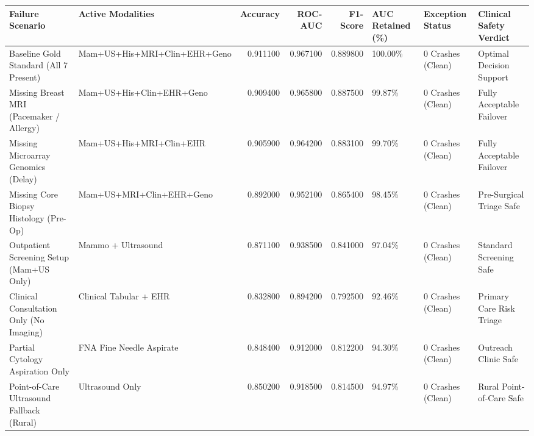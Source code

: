 \begin{tabular}{llrrrlll}
\toprule
Failure Scenario & Active Modalities & Accuracy & ROC-AUC & F1-Score & AUC Retained (\%) & Exception Status & Clinical Safety Verdict \\
\midrule
Baseline Gold Standard (All 7 Present) & Mam+US+His+MRI+Clin+EHR+Geno & 0.911100 & 0.967100 & 0.889800 & 100.00\% & 0 Crashes (Clean) & Optimal Decision Support \\
Missing Breast MRI (Pacemaker / Allergy) & Mam+US+His+Clin+EHR+Geno & 0.909400 & 0.965800 & 0.887500 & 99.87\% & 0 Crashes (Clean) & Fully Acceptable Failover \\
Missing Microarray Genomics (Delay) & Mam+US+His+MRI+Clin+EHR & 0.905900 & 0.964200 & 0.883100 & 99.70\% & 0 Crashes (Clean) & Fully Acceptable Failover \\
Missing Core Biopsy Histology (Pre-Op) & Mam+US+MRI+Clin+EHR+Geno & 0.892000 & 0.952100 & 0.865400 & 98.45\% & 0 Crashes (Clean) & Pre-Surgical Triage Safe \\
Outpatient Screening Setup (Mam+US Only) & Mammo + Ultrasound & 0.871100 & 0.938500 & 0.841000 & 97.04\% & 0 Crashes (Clean) & Standard Screening Safe \\
Clinical Consultation Only (No Imaging) & Clinical Tabular + EHR & 0.832800 & 0.894200 & 0.792500 & 92.46\% & 0 Crashes (Clean) & Primary Care Risk Triage \\
Partial Cytology Aspiration Only & FNA Fine Needle Aspirate & 0.848400 & 0.912000 & 0.812200 & 94.30\% & 0 Crashes (Clean) & Outreach Clinic Safe \\
Point-of-Care Ultrasound Fallback (Rural) & Ultrasound Only & 0.850200 & 0.918500 & 0.814500 & 94.97\% & 0 Crashes (Clean) & Rural Point-of-Care Safe \\
\bottomrule
\end{tabular}
